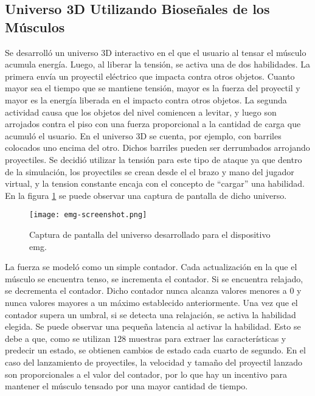 \subsection{Universo 3D Utilizando Bioseñales de los Músculos}

Se desarrolló un universo 3D interactivo en el que el usuario al tensar el músculo acumula energía. Luego, al liberar la tensión, se activa una de dos habilidades. La primera envía un proyectil eléctrico que impacta contra otros objetos. Cuanto mayor sea el tiempo que se mantiene tensión, mayor es la fuerza del proyectil y mayor es la energía liberada en el impacto contra otros objetos. La segunda actividad causa que los objetos del nivel comiencen a levitar, y luego son arrojados contra el piso con una fuerza proporcional a la cantidad de carga que acumuló el usuario. En el universo 3D se cuenta, por ejemplo, con barriles colocados uno encima del otro. Dichos barriles pueden ser derrumbados arrojando proyectiles. Se decidió utilizar la tensión para este tipo de ataque ya que dentro de la simulación, los proyectiles se crean desde el el brazo y mano del jugador virtual, y la tension constante encaja con el concepto de ``cargar'' una habilidad. En la figura \ref{fig:emg-screenshot} se puede observar una captura de pantalla de dicho universo.

\begin{figure}[H]
	\centering
    \texttt{[image: emg-screenshot.png]}
    \caption{Captura de pantalla del universo desarrollado para el dispositivo \acrshort{emg}.}
	\label{fig:emg-screenshot}
\end{figure}


La fuerza se modeló como un simple contador. Cada actualización en la que el músculo se encuentra tenso, se incrementa el contador. Si se encuentra relajado, se decrementa el contador. Dicho contador nunca alcanza valores menores a $0$ y nunca valores mayores a un máximo establecido anteriormente. Una vez que el contador supera un umbral, si se detecta una relajación, se activa la habilidad elegida. Se puede observar una pequeña latencia al activar la habilidad. Esto se debe a que, como se utilizan $128$ muestras para extraer las características y predecir un estado, se obtienen cambios de estado cada cuarto de segundo. En el caso del lanzamiento de proyectiles, la velocidad y tamaño del proyectil lanzado son proporcionales a el valor del contador, por lo que hay un incentivo para mantener el músculo tensado por una mayor cantidad de tiempo.


